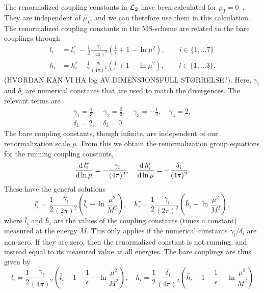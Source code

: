 The renormalized coupling constants in $\mathcal{L}_2$ have been calculated for $\mu_I = 0$~\cite{Gasser-Leutwyler:chiral}.
They are independent of $\mu_I$, and we can therefore use them in this calculation.
The renormalized coupling constants in the $\overline{\mathrm{MS}}$-scheme are related to the bare couplings through
\begin{align}
    l_i 
    & = 
    l_i^r \, \,
    - \frac{1}{2} \frac{\gamma_i }{(4 \pi)^2} 
    \left(\frac{1}{\epsilon} + 1 - \ln \mu^2\right),
    \quad \quad
    i \in \{1, ... 7\} 
    \\
    h_i 
    & = 
    h_i^r
    - \frac{1}{2} \frac{\delta_i }{(4 \pi)^2} 
    \left(\frac{1}{\epsilon} + 1 - \ln \mu^2 \right), 
    \quad \quad
    i \in \{1, ... 3\}.
\end{align}
(HVORDAN KAN VI HA log AV DIMENSJONSFULL STØRRELSE?).
Here, $\gamma_i$ and $\delta_i$ are numerical constants that are used to match the divergences.
The relevant terms are
\begin{gather}
    \gamma_1 = \frac{1}{3}, \quad
    \gamma_2 = \frac{2}{3}, \quad
    \gamma_3 = - \frac{1}{2}, \quad
    \gamma_4 = 2, \\
    \delta_1 = 2, \quad
    \delta_3 = 0.
\end{gather}
The bare coupling constants, though infinite, are independent of our renormalization scale $\mu$.
From this we obtain the renormalization group equations for the running coupling constants,
\begin{equation}
    \diff{\, l_i^r}{\ln \mu } = - \frac{\gamma_i}{(4 \pi)^2}, \quad
    \diff{\, h_i^r}{\ln \mu } = - \frac{\delta_i}{(4 \pi)^2}.
\end{equation}
These have the general solutions
\begin{equation}
    l_i^r 
    = \frac{1}{2} \frac{\gamma_i}{(2 \pi)^2} 
    \left( \bar l_i - \ln{\frac{\mu^2}{M^2}} \right),
    \quad
    h_i^r 
    = \frac{1}{2} \frac{\gamma_i}{(2 \pi)^2} 
    \left( \bar h_i - \ln{\frac{\mu^2}{M^2}} \right),
\end{equation}
where $\bar l_i$ and $\bar h_i$ are the values of the coupling constants (times a constant) measured at the energy $M$.
This only applies if the numerical constants $\gamma_i$/$\delta_i$ are non-zero.
If they are zero, then the renormalized constant is not running, and instead equal to its measured value at all energies.
The bare couplings are thus given by
\begin{equation}
    l_i = \frac{1}{2} \frac{\gamma_i}{(4 \pi)^2}
    \left(\bar l_i - 1 - \frac{1}{\epsilon} - \ln\frac{\mu^2}{M^2}\right), \quad
    h_i = \frac{1}{2} \frac{\delta_i}{(4 \pi)^2}
    \left(\bar h_i - 1 - \frac{1}{\epsilon} - \ln\frac{\mu^2}{M^2}\right)
\end{equation}
